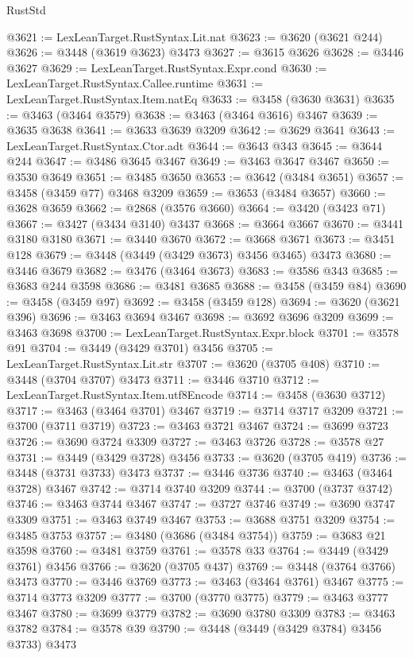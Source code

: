 \begin{lexlean}{RustStd}
\begin{coremodule}
{\begin{coremodule}
{{{{{{{{{{{{{{{{{{{{{{{{{{{{{{{{{{{{{{{{{{{{{{{{{{{{{{{{{{{{{{{{{{{{{{{{{{{{{{{{{{{{{@3621 := LexLeanTarget.RustSyntax.Lit.nat
@3623 := @3620 (@3621 @244)
@3626 := @3448 (@3619 @3623) @3473
@3627 := @3615 @3626
@3628 := @3446 @3627
@3629 := LexLeanTarget.RustSyntax.Expr.cond
@3630 := LexLeanTarget.RustSyntax.Callee.runtime
@3631 := LexLeanTarget.RustSyntax.Item.natEq
@3633 := @3458 (@3630 @3631)
@3635 := @3463 (@3464 @3579)
@3638 := @3463 (@3464 @3616) @3467
@3639 := @3635 @3638
@3641 := @3633 @3639 @3209
@3642 := @3629 @3641
@3643 := LexLeanTarget.RustSyntax.Ctor.adt
@3644 := @3643 @343
@3645 := @3644 @244
@3647 := @3486 @3645 @3467
@3649 := @3463 @3647 @3467
@3650 := @3530 @3649
@3651 := @3485 @3650
@3653 := @3642 (@3484 @3651)
@3657 := @3458 (@3459 @77) @3468 @3209
@3659 := @3653 (@3484 @3657)
@3660 := @3628 @3659
@3662 := @2868 (@3576 @3660)
@3664 := @3420 (@3423 @71)
@3667 := @3427 (@3434 @3140) @3437
@3668 := @3664 @3667
@3670 := @3441 @3180 @3180
@3671 := @3440 @3670
@3672 := @3668 @3671
@3673 := @3451 @128
@3679 := @3448 (@3449 (@3429 @3673) @3456 @3465) @3473
@3680 := @3446 @3679
@3682 := @3476 (@3464 @3673)
@3683 := @3586 @343
@3685 := @3683 @244 @3598
@3686 := @3481 @3685
@3688 := @3458 (@3459 @84)
@3690 := @3458 (@3459 @97)
@3692 := @3458 (@3459 @128)
@3694 := @3620 (@3621 @396)
@3696 := @3463 @3694 @3467
@3698 := @3692 @3696 @3209
@3699 := @3463 @3698
@3700 := LexLeanTarget.RustSyntax.Expr.block
@3701 := @3578 @91
@3704 := @3449 (@3429 @3701) @3456
@3705 := LexLeanTarget.RustSyntax.Lit.str
@3707 := @3620 (@3705 @408)
@3710 := @3448 (@3704 @3707) @3473
@3711 := @3446 @3710
@3712 := LexLeanTarget.RustSyntax.Item.utf8Encode
@3714 := @3458 (@3630 @3712)
@3717 := @3463 (@3464 @3701) @3467
@3719 := @3714 @3717 @3209
@3721 := @3700 (@3711 @3719)
@3723 := @3463 @3721 @3467
@3724 := @3699 @3723
@3726 := @3690 @3724 @3309
@3727 := @3463 @3726
@3728 := @3578 @27
@3731 := @3449 (@3429 @3728) @3456
@3733 := @3620 (@3705 @419)
@3736 := @3448 (@3731 @3733) @3473
@3737 := @3446 @3736
@3740 := @3463 (@3464 @3728) @3467
@3742 := @3714 @3740 @3209
@3744 := @3700 (@3737 @3742)
@3746 := @3463 @3744 @3467
@3747 := @3727 @3746
@3749 := @3690 @3747 @3309
@3751 := @3463 @3749 @3467
@3753 := @3688 @3751 @3209
@3754 := @3485 @3753
@3757 := @3480 (@3686 (@3484 @3754))
@3759 := @3683 @21 @3598
@3760 := @3481 @3759
@3761 := @3578 @33
@3764 := @3449 (@3429 @3761) @3456
@3766 := @3620 (@3705 @437)
@3769 := @3448 (@3764 @3766) @3473
@3770 := @3446 @3769
@3773 := @3463 (@3464 @3761) @3467
@3775 := @3714 @3773 @3209
@3777 := @3700 (@3770 @3775)
@3779 := @3463 @3777 @3467
@3780 := @3699 @3779
@3782 := @3690 @3780 @3309
@3783 := @3463 @3782
@3784 := @3578 @39
@3790 := @3448 (@3449 (@3429 @3784) @3456 @3733) @3473
}}}}}}}}}}}}}}}}}}}}}}}}}}}}}}}}}}}}}}}}}}}}}}}}}}}}}}}}}}}}}}}}}}}}}}}}}}}}}}}}}}}}}
\end{coremodule}}
\end{coremodule}
\end{lexlean}
